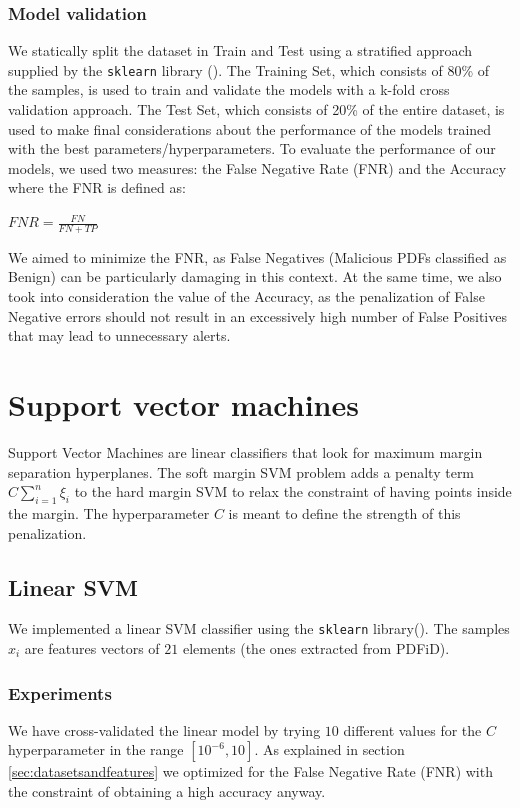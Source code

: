 \documentclass[twocolumn, switch]{article} %
\begin{document}
\subsubsection{Model validation}
We statically split the dataset in Train and Test using a stratified approach supplied by the \texttt{sklearn} library (\cite{scikit-learn}). The Training Set, which consists of 80\% of the samples, is used to train and validate the models with a k-fold cross validation approach. The Test Set, which consists of 20\% of the entire dataset, is used to make final considerations about the performance of the models trained with the best parameters/hyperparameters.
To evaluate the performance of our models, we used two measures: the False Negative Rate (FNR) and the Accuracy where the FNR is defined as:
\begin{center}
	$FNR = \frac{FN}{FN + TP}$
\end{center}
We aimed to minimize the FNR, as False Negatives (Malicious PDFs classified as Benign) can be particularly damaging in this context.
At the same time, we also took into consideration the value of the Accuracy, as the penalization of False Negative errors should not result in an excessively high number of False Positives that may lead to unnecessary alerts.

\section{Support vector machines}
\label{sec:svm}
Support Vector Machines are linear classifiers that look for maximum margin separation hyperplanes.
The soft margin SVM problem adds a penalty term $C\sum_{i=1}^{n}\xi_i$ to the hard margin SVM to relax the constraint of having points inside the margin. The hyperparameter $C$ is meant to define the strength of this penalization.
\subsection{Linear SVM}
We implemented a linear SVM classifier using the \texttt{sklearn} library(\cite{scikit-learn}). The samples $x_i$ are features vectors of $21$ elements (the ones extracted from PDFiD).

\subsubsection{Experiments}
We have cross-validated the linear model by trying $10$ different values for the $C$ hyperparameter in the range $[10^{-6}, 10]$. As explained in section \ref{sec:datasetsandfeatures} we optimized for the False Negative Rate (FNR) with the constraint of obtaining a high accuracy anyway.
\end{document}
